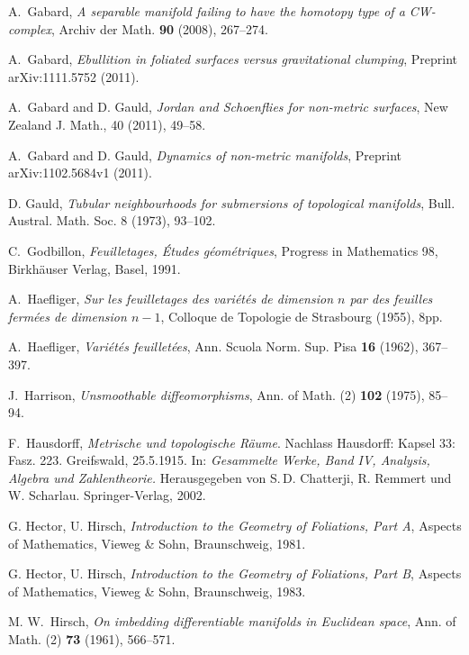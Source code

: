 \documentclass{amsart}
\begin{document}
\begin{thebibliography}{30}
A.~Gabard, \textsl{A separable manifold failing to have the
homotopy type of a CW-complex}, Archiv der Math. {\bf 90}
(2008), 267--274.

\fi

A.~Gabard, \textsl{Ebullition in foliated surfaces versus gravitational clumping}, Preprint arXiv:1111.5752 (2011).

A.~Gabard and D. Gauld, \textsl{Jordan and Schoenflies for non-metric surfaces}, New Zealand J. Math., 40 (2011), 49--58.

A.~Gabard and D. Gauld, \textsl{Dynamics of non-metric manifolds}, Preprint arXiv:1102.5684v1
(2011).

\iffalse

 D. Gauld, \textsl{Tubular neighbourhoods for
submersions of topological manifolds}, Bull. Austral. Math.
Soc.  8 (1973), 93--102.

C.~Godbillon, {\em Feuilletages, \'Etudes g\'eom\'etriques},
Progress in Mathematics 98, Birkh\"auser Verlag, Basel, 1991.

A.~Haefliger, \textsl{Sur les feuilletages des vari\'et\'es de
dimension $n$ par des feuilles ferm\'ees de dimension $n-1$},
Colloque de Topologie de Strasbourg (1955), 8pp.

A.~Haefliger, \textsl{Vari\'et\'es feuillet\'ees}, Ann. Scuola
Norm. Sup. Pisa {\bf 16} (1962), 367--397.

J.~Harrison, \textsl{Unsmoothable diffeomorphisms}, Ann. of
Math. (2) {\bf 102} (1975), 85--94.

F.~Hausdorff, \textsl{Metrische und topologische R\"aume}.
Nachlass Hausdorff: Kapsel 33: Fasz. 223. Greifswald,
25.5.1915. In: {\em Gesammelte Werke, Band IV, Analysis,
Algebra und Zahlentheorie.} Herausgegeben von S.\,D.
Chatterji, R. Remmert und W. Scharlau. Springer-Verlag, 2002.

G. Hector, U. Hirsch, {\em Introduction to the Geometry of
Foliations, Part A}, Aspects of Mathematics, Vieweg \& Sohn,
Braunschweig, 1981.

G. Hector, U. Hirsch, {\em Introduction to the Geometry of
Foliations, Part B}, Aspects of Mathematics, Vieweg \& Sohn,
Braunschweig, 1983.

M. W.~Hirsch, \textsl{On imbedding differentiable manifolds in
Euclidean space}, Ann. of Math. (2) {\bf 73} (1961), 566--571.


\end{thebibliography}
\end{document}
